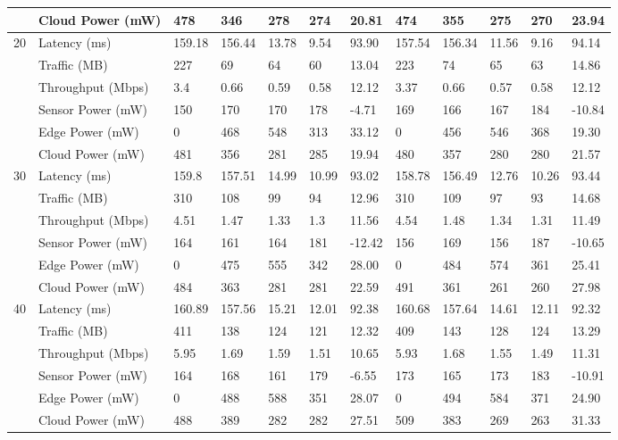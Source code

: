 \documentclass[11pt]{article}
\begin{document}
\begin{landscape}
\begin{table}[t]
{\begin{tabular}{llllllllllll}
					& Cloud Power (mW) & 478 & 346 & 278 & 274 & 20.81 & 474 & 355 & 275 & 270 & 23.94 \\
					\midrule
					\multirow{6}{*}{20} & Latency (ms) & 159.18 & 156.44 & 13.78 & 9.54 & 93.90 & 157.54 & 156.34 & 11.56 & 9.16 & 94.14 \\
					& Traffic (MB) & 227 & 69 & 64 & 60 & 13.04 & 223 & 74 & 65 & 63 & 14.86 \\
					& Throughput (Mbps)  & 3.4 & 0.66 & 0.59 & 0.58 & 12.12 & 3.37 & 0.66 & 0.57 & 0.58 & 12.12 \\
					& Sensor Power (mW) & 150 & 170 & 170 & 178 & -4.71 & 169 & 166 & 167 & 184 & -10.84 \\
					& Edge Power (mW) & 0 & 468 & 548 & 313 & 33.12 & 0 & 456 & 546 & 368 & 19.30 \\
					& Cloud Power (mW) & 481 & 356 & 281 & 285 & 19.94 & 480 & 357 & 280 & 280 & 21.57 \\
					\midrule
					\multirow{6}{*}{30} & Latency (ms) & 159.8 & 157.51 & 14.99 & 10.99 & 93.02 & 158.78 & 156.49 & 12.76 & 10.26 & 93.44 \\
					& Traffic (MB) & 310 & 108 & 99 & 94 & 12.96 & 310 & 109 & 97 & 93 & 14.68 \\
					& Throughput (Mbps)  & 4.51 & 1.47 & 1.33 & 1.3 & 11.56 & 4.54 & 1.48 & 1.34 & 1.31 & 11.49 \\
					& Sensor Power (mW) & 164 & 161 & 164 & 181 & -12.42 & 156 & 169 & 156 & 187 & -10.65 \\
					& Edge Power (mW) & 0 & 475 & 555 & 342 & 28.00 & 0 & 484 & 574 & 361 & 25.41 \\
					& Cloud Power (mW) & 484 & 363 & 281 & 281 & 22.59 & 491 & 361 & 261 & 260 & 27.98 \\
					\midrule
					\multirow{6}{*}{40} & Latency (ms) & 160.89 & 157.56 & 15.21 & 12.01 & 92.38 & 160.68 & 157.64 & 14.61 & 12.11 & 92.32 \\
					& Traffic (MB) & 411 & 138 & 124 & 121 & 12.32 & 409 & 143 & 128 & 124 & 13.29 \\
					& Throughput (Mbps)  & 5.95 & 1.69 & 1.59 & 1.51 & 10.65 & 5.93 & 1.68 & 1.55 & 1.49 & 11.31 \\
					& Sensor Power (mW) & 164 & 168 & 161 & 179 & -6.55 & 173 & 165 & 173 & 183 & -10.91 \\
					& Edge Power (mW) & 0 & 488 & 588 & 351 & 28.07 & 0 & 494 & 584 & 371 & 24.90 \\
					& Cloud Power (mW) & 488 & 389 & 282 & 282 & 27.51 & 509 & 383 & 269 & 263 & 31.33 \\
					\bottomrule
				\end{tabular}
			}
		\end{table}
	\end{landscape}
	
\end{document}
